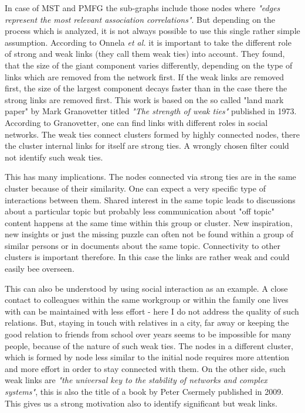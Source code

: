 \documentclass[a4paper,10pt]{scrbook}
\begin{document}
In case of MST and PMFG the sub-graphs include those nodes where \textit{"edges represent the most relevant association correlations"}. But depending on the process which is analyzed, it is not always possible to use this single rather simple assumption. According to Onnela \textit{et al.} \cite{Onnela2007} it is important to take the different role of strong and weak links (they call them weak ties) into account. They found, that the size of the giant component varies differently, depending on the type of links which are removed from the network first. If the weak links are removed first, the size of the largest component decays faster than in the case there the strong links are removed first. This work is based on the so called "land mark paper" by Mark Granovetter \cite{Granovetter1973} titled \textit{"The strength of weak ties"} published in 1973. According to Granovetter, one can find links with different roles in social networks. The weak ties connect clusters formed by highly connected nodes, there the cluster internal links for itself are strong ties. A wrongly chosen filter could not identify such weak ties.   

This has many implications. The nodes connected via strong ties are in the same cluster because of their similarity. One can expect a very specific type of interactions between them. Shared interest in the same topic leads to discussions about a particular topic but probably less communication about "off topic" content happens at the same time within this group or cluster. New inspiration, new insights or just the missing puzzle can often not be found within a group of similar persons or in documents about the same topic. Connectivity to other clusters is important therefore. In this case the links are rather weak and could easily bee overseen. 

This can also be understood by using social interaction as an example. A close contact to colleagues within the same workgroup or within the family one lives with can be maintained with less effort - here I do not address the quality of such relations. But, staying in touch with relatives in a city, far away or keeping the good relation to friends from school over years seems to be impossible for many people, because of the nature of such weak ties. The nodes in a different cluster, which is formed by node less similar to the  initial node requires more attention and more effort in order to stay connected with them. On the other side, such weak links are \textit{"the universal key to the stability of networks and complex systems"}, this is also the title of a book by Peter Csermely \cite{csermely2009weak} published in 2009. This gives us a strong motivation also to identify significant but weak links.  
\end{document}
